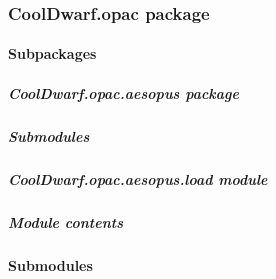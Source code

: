 \documentclass[letterpaper,10pt,english]{sphinxmanual}
\begin{document}
\subsubsection{CoolDwarf.opac package}
\label{\detokenize{CoolDwarf.opac:cooldwarf-opac-package}}\label{\detokenize{CoolDwarf.opac::doc}}

\paragraph{Subpackages}
\label{\detokenize{CoolDwarf.opac:subpackages}}
\sphinxstepscope


\subparagraph{CoolDwarf.opac.aesopus package}
\label{\detokenize{CoolDwarf.opac.aesopus:cooldwarf-opac-aesopus-package}}\label{\detokenize{CoolDwarf.opac.aesopus::doc}}

\subparagraph{Submodules}
\label{\detokenize{CoolDwarf.opac.aesopus:submodules}}

\subparagraph{CoolDwarf.opac.aesopus.load module}
\label{\detokenize{CoolDwarf.opac.aesopus:module-CoolDwarf.opac.aesopus.load}}\label{\detokenize{CoolDwarf.opac.aesopus:cooldwarf-opac-aesopus-load-module}}

\begin{fulllineitems}
\label{\detokenize{CoolDwarf.opac.aesopus:CoolDwarf.opac.aesopus.load.load_lowtempopac}}
\pysigstartsignatures
{}
\pysigstopsignatures
\end{fulllineitems}



\subparagraph{Module contents}
\label{\detokenize{CoolDwarf.opac.aesopus:module-CoolDwarf.opac.aesopus}}\label{\detokenize{CoolDwarf.opac.aesopus:module-contents}}

\paragraph{Submodules}
\label{\detokenize{CoolDwarf.opac:submodules}}
\end{document}
